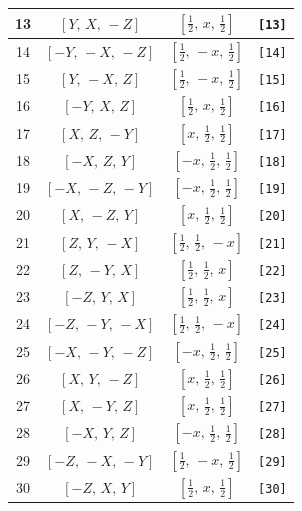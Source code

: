 \documentclass[fleqn,8pt]{jsarticle}
\begin{document}
\begin{longtable}{cccc}
13 & $\left[ Y,\, X,\, - Z \right]$ & $\left[ \frac{1}{2},\, x,\, \frac{1}{2} \right]$ & {\tt [13]} \\ \hline
14 & $\left[ - Y,\, - X,\, - Z \right]$ & $\left[ \frac{1}{2},\, - x,\, \frac{1}{2} \right]$ & {\tt [14]} \\ \hline
15 & $\left[ Y,\, - X,\, Z \right]$ & $\left[ \frac{1}{2},\, - x,\, \frac{1}{2} \right]$ & {\tt [15]} \\ \hline
16 & $\left[ - Y,\, X,\, Z \right]$ & $\left[ \frac{1}{2},\, x,\, \frac{1}{2} \right]$ & {\tt [16]} \\ \hline
17 & $\left[ X,\, Z,\, - Y \right]$ & $\left[ x,\, \frac{1}{2},\, \frac{1}{2} \right]$ & {\tt [17]} \\ \hline
18 & $\left[ - X,\, Z,\, Y \right]$ & $\left[ - x,\, \frac{1}{2},\, \frac{1}{2} \right]$ & {\tt [18]} \\ \hline
19 & $\left[ - X,\, - Z,\, - Y \right]$ & $\left[ - x,\, \frac{1}{2},\, \frac{1}{2} \right]$ & {\tt [19]} \\ \hline
20 & $\left[ X,\, - Z,\, Y \right]$ & $\left[ x,\, \frac{1}{2},\, \frac{1}{2} \right]$ & {\tt [20]} \\ \hline
21 & $\left[ Z,\, Y,\, - X \right]$ & $\left[ \frac{1}{2},\, \frac{1}{2},\, - x \right]$ & {\tt [21]} \\ \hline
22 & $\left[ Z,\, - Y,\, X \right]$ & $\left[ \frac{1}{2},\, \frac{1}{2},\, x \right]$ & {\tt [22]} \\ \hline
23 & $\left[ - Z,\, Y,\, X \right]$ & $\left[ \frac{1}{2},\, \frac{1}{2},\, x \right]$ & {\tt [23]} \\ \hline
24 & $\left[ - Z,\, - Y,\, - X \right]$ & $\left[ \frac{1}{2},\, \frac{1}{2},\, - x \right]$ & {\tt [24]} \\ \hline
25 & $\left[ - X,\, - Y,\, - Z \right]$ & $\left[ - x,\, \frac{1}{2},\, \frac{1}{2} \right]$ & {\tt [25]} \\ \hline
26 & $\left[ X,\, Y,\, - Z \right]$ & $\left[ x,\, \frac{1}{2},\, \frac{1}{2} \right]$ & {\tt [26]} \\ \hline
27 & $\left[ X,\, - Y,\, Z \right]$ & $\left[ x,\, \frac{1}{2},\, \frac{1}{2} \right]$ & {\tt [27]} \\ \hline
28 & $\left[ - X,\, Y,\, Z \right]$ & $\left[ - x,\, \frac{1}{2},\, \frac{1}{2} \right]$ & {\tt [28]} \\ \hline
29 & $\left[ - Z,\, - X,\, - Y \right]$ & $\left[ \frac{1}{2},\, - x,\, \frac{1}{2} \right]$ & {\tt [29]} \\ \hline
30 & $\left[ - Z,\, X,\, Y \right]$ & $\left[ \frac{1}{2},\, x,\, \frac{1}{2} \right]$ & {\tt [30]} \\ \hline

\end{longtable}
\end{document}

